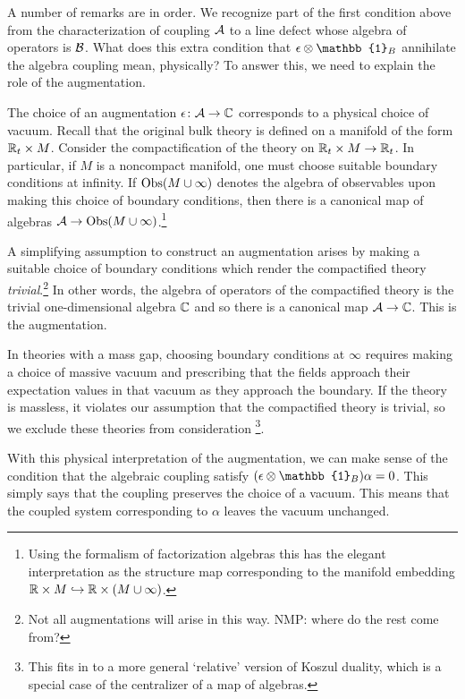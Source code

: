 \documentclass[11pt]{amsart}
\def\id{\mathbb{1}}
\def\natalie#1{{\textcolor{green!65!black}{NMP: {#1}}}}
\begin{document}
A number of remarks are in order. 
We recognize part of the first condition above from the characterization of coupling $\mathcal A$ to a line defect whose algebra of operators is $\mathcal B$.
What does this extra condition that $\ep \otimes \id_B$ annihilate the algebra coupling mean, physically? 
To answer this, we need to explain the role of the augmentation.

The choice of an augmentation $\epsilon \colon \mathcal A \to \mathbb C$ corresponds to a physical choice of vacuum. 
Recall that the original bulk theory is defined on a manifold of the form $\mathbb R_t \times M$. 
Consider the compactification of the theory on $\mathbb R_t \times M \rightarrow \mathbb R_t$. 
In particular, if $M$ is a noncompact manifold, one must choose suitable boundary conditions at infinity. 
If ${\rm Obs}(M \cup \infty)$ denotes the algebra of observables upon making this choice of boundary conditions, then there is a canonical map of algebras $\mathcal A \to {\rm Obs}(M \cup \infty)$.\footnote{Using the formalism of factorization algebras this has the elegant interpretation as the structure map corresponding to the manifold embedding $\mathbb R \times M \hookrightarrow \mathbb R \times (M \cup \infty)$.} 

A simplifying assumption to construct an augmentation arises by making a suitable choice of boundary conditions which render the compactified theory {\em trivial}.\footnote{Not all augmentations will arise in this way. \natalie{where do the rest come from?}}
In other words, the algebra of operators of the compactified theory is the trivial one-dimensional algebra $\mathbb C$ and so there is a canonical map $\mathcal A \to \mathbb C$.
This is the augmentation. 

In theories with a mass gap, choosing boundary conditions at $\infty$ requires making a choice of massive vacuum and prescribing that the fields approach their expectation values in that vacuum as they approach the boundary. 
If the theory is massless, it violates our assumption that the compactified theory is trivial, so we exclude these theories from consideration \footnote{This fits in to a more general `relative' version of Koszul duality, which is a special case of the centralizer of a map of algebras.}.

With this physical interpretation of the augmentation, we can make sense of the condition that the algebraic coupling satisfy $(\ep \otimes \id_B) \alpha = 0$.
This simply says that the coupling preserves the choice of a vacuum.
This means that the coupled system corresponding to $\alpha$ leaves the vacuum unchanged.
\end{document}
